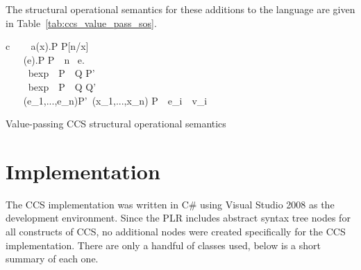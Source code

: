 	The structural operational semantics for these additions to the language are given in Table~\ref{tab:ccs_value_pass_sos}.	

\begin{table}[t]
	\begin{ARRAY}{c}
		\ \ \ \Inference{                              }
	                            {a(x).P  P[n/x]} \vspace{10pt}\\
	\ \ \ \Inference{                              }
	                            {(e).P  P}\ \ n \ e. \vspace{10pt}\\
		\ \ \ 
	                            {\ bexp\ \ P\  \ Q \infarrow{\alpha} P'}\ \  \vspace{10pt}\\
		\ \ \ 
	                            {\ bexp\ \ P\  \ Q \infarrow{\alpha} Q'}\ \  \vspace{10pt}\\

		\ \ \ 
	 {(e_1,...,e_n)\infarrow{\alpha}P'}\ (x_1,...,x_n)  P\ \ e_i\ \ v_i\vspace{10pt}\\
	                            
	\end{ARRAY}
	\caption{Value-passing CCS structural operational semantics}
	\label{tab:ccs_value_pass_sos}
\end{table}


\section{Implementation}

	The CCS implementation was written in C\# using Visual Studio 2008 as the 
	development environment. Since the PLR includes abstract syntax tree nodes 
	for all constructs of CCS, no additional nodes were created specifically for 
	the CCS implementation. There are only a handful of classes used, below is a 
	short summary of each one.


